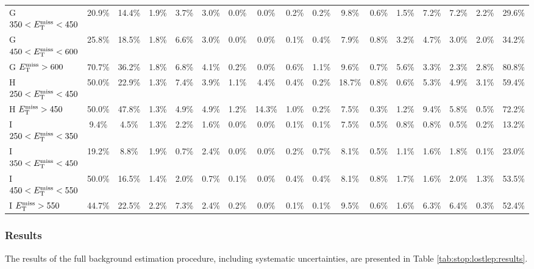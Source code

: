 \begin{table}
\begin{tabular}{| l | c c | c c c c c c c c c c c c c | c |}
 G  $350<E_\text{T}^\text{miss}<450$  & 20.9\%  & 14.4\%  & 1.9\%  & 3.7\%  & 3.0\%  & 0.0\%  & 0.0\%  & 0.2\%  & 0.2\%  & 9.8\%  & 0.6\%  & 1.5\%  & 7.2\%  & 7.2\%  & 2.2\%  & 29.6\%  \\
 G  $450<E_\text{T}^\text{miss}<600$  & 25.8\%  & 18.5\%  & 1.8\%  & 6.6\%  & 3.0\%  & 0.0\%  & 0.0\%  & 0.1\%  & 0.4\%  & 7.9\%  & 0.8\%  & 3.2\%  & 4.7\%  & 3.0\%  & 2.0\%  & 34.2\%  \\
 G  $E_\text{T}^\text{miss} >600$  & 70.7\%  & 36.2\%  & 1.8\%  & 6.8\%  & 4.1\%  & 0.2\%  & 0.0\%  & 0.6\%  & 1.1\%  & 9.6\%  & 0.7\%  & 5.6\%  & 3.3\%  & 2.3\%  & 2.8\%  & 80.8\%  \\
\hline
 H  $250<E_\text{T}^\text{miss}<450$  & 50.0\%  & 22.9\%  & 1.3\%  & 7.4\%  & 3.9\%  & 1.1\%  & 4.4\%  & 0.4\%  & 0.2\%  & 18.7\%  & 0.8\%  & 0.6\%  & 5.3\%  & 4.9\%  & 3.1\%  & 59.4\%  \\
 H  $E_\text{T}^\text{miss} >450$ & 50.0\% & 47.8\% & 1.3\% & 4.9\% & 4.9\% & 1.2\% & 14.3\% & 1.0\% & 0.2\% & 7.5\% & 0.3\% & 1.2\% & 9.4\% & 5.8\% & 0.5\% & 72.2\% \\
\hline
 I  $250<E_\text{T}^\text{miss}<350$  & 9.4\%  & 4.5\%  & 1.3\%  & 2.2\%  & 1.6\%  & 0.0\%  & 0.0\%  & 0.1\%  & 0.1\%  & 7.5\%  & 0.5\%  & 0.8\%  & 0.8\%  & 0.5\%  & 0.2\%  & 13.2\%  \\
 I  $350<E_\text{T}^\text{miss}<450$  & 19.2\%  & 8.8\%  & 1.9\%  & 0.7\%  & 2.4\%  & 0.0\%  & 0.0\%  & 0.2\%  & 0.7\%  & 8.1\%  & 0.5\%  & 1.1\%  & 1.6\%  & 1.8\%  & 0.1\%  & 23.0\%  \\
 I  $450<E_\text{T}^\text{miss}<550$  & 50.0\%  & 16.5\%  & 1.4\%  & 2.0\%  & 0.7\%  & 0.1\%  & 0.0\%  & 0.4\%  & 0.4\%  & 8.1\%  & 0.8\%  & 1.7\%  & 1.6\%  & 2.0\%  & 1.3\%  & 53.5\%  \\
 I  $E_\text{T}^\text{miss} >550$ & 44.7\% & 22.5\% & 2.2\% & 7.3\% & 2.4\% & 0.2\% & 0.0\% & 0.1\% & 0.1\% & 9.5\% & 0.6\% & 1.6\% & 6.3\% & 6.4\% & 0.3\% & 52.4\% \\
\hline
\end{tabular}
\end{table}

\subsubsection{Results}
\label{sssec:stop:lostlep:results}

The results of the full background estimation procedure, including
systematic uncertainties, are presented in Table
\ref{tab:stop:lostlep:results}.

